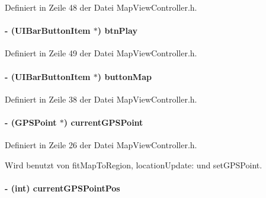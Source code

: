 Definiert in Zeile 48 der Datei MapViewController.h.\hypertarget{interface_map_view_controller_a3af316be6b8a063567aaf1720dede525}{
\paragraph[{btnPlay}]{\setlength{\rightskip}{0pt plus 5cm}-\/ (UIBarButtonItem $\ast$) btnPlay}\hfill}
\label{interface_map_view_controller_a3af316be6b8a063567aaf1720dede525}


Definiert in Zeile 49 der Datei MapViewController.h.\hypertarget{interface_map_view_controller_a054673874ec0329457346065af298c0b}{
\paragraph[{buttonMap}]{\setlength{\rightskip}{0pt plus 5cm}-\/ (UIBarButtonItem $\ast$) buttonMap}\hfill}
\label{interface_map_view_controller_a054673874ec0329457346065af298c0b}


Definiert in Zeile 38 der Datei MapViewController.h.\hypertarget{interface_map_view_controller_a623b304bb044927ee00052aeb5c18100}{
\paragraph[{currentGPSPoint}]{\setlength{\rightskip}{0pt plus 5cm}-\/ ({\bf GPSPoint} $\ast$) currentGPSPoint}\hfill}
\label{interface_map_view_controller_a623b304bb044927ee00052aeb5c18100}


Definiert in Zeile 26 der Datei MapViewController.h.

Wird benutzt von fitMapToRegion, locationUpdate: und setGPSPoint.\hypertarget{interface_map_view_controller_a8b5fb733f6bd00dd08f1cf90808f4420}{
\paragraph[{currentGPSPointPos}]{\setlength{\rightskip}{0pt plus 5cm}-\/ (int) currentGPSPointPos}\hfill}
\label{interface_map_view_controller_a8b5fb733f6bd00dd08f1cf90808f4420}


